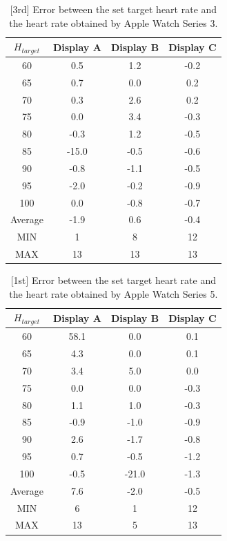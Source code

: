 \documentclass[sigchi,authordraft]{acmart}
\begin{document}
\begin{table}[!t]
  \centering
  \caption{[3rd] Error between the set target heart rate and the heart rate obtained by Apple Watch Series 3.}
  \begin{tabular}{c|c|c|c} \hline\hline
    $H_{target}$ & Display A & Display B & Display C \\ \hline
    60 & 0.5 & 1.2 & -0.2 \\
    65 & 0.7 & 0.0 & 0.2 \\
    70 & 0.3 & 2.6 & 0.2 \\
    75 & 0.0 & 3.4 & -0.3 \\
    80 & -0.3 & 1.2 & -0.5 \\
    85 & -15.0 & -0.5 & -0.6 \\
    90 & -0.8 & -1.1 & -0.5 \\
    95 & -2.0 & -0.2 & -0.9 \\
    100 & 0.0 & -0.8 & -0.7 \\ \hline
    Average & -1.9 & 0.6 & -0.4 \\ \hline \hline
    MIN & 1 & 8 & 12 \\ \hline
    MAX & 13 & 13 & 13 \\ \hline
  \end{tabular}
  \label{tab:series3_result_3rd}
\end{table}

\begin{table}[!t]
  \centering
  \caption{[1st] Error between the set target heart rate and the heart rate obtained by Apple Watch Series 5.}
  \begin{tabular}{c|c|c|c} \hline\hline
    $H_{target}$ & Display A & Display B & Display C \\ \hline
    60 & 58.1 & 0.0 & 0.1 \\
    65 & 4.3 & 0.0 & 0.1 \\
    70 & 3.4 & 5.0 & 0.0 \\
    75 & 0.0 & 0.0 & -0.3 \\
    80 & 1.1 & 1.0 & -0.3 \\
    85 & -0.9 & -1.0 & -0.9 \\
    90 & 2.6 & -1.7 & -0.8 \\
    95 & 0.7 & -0.5 & -1.2 \\
    100 & -0.5 & -21.0 & -1.3 \\ \hline
    Average & 7.6 & -2.0 & -0.5 \\ \hline \hline
    MIN & 6 & 1 & 12 \\ \hline
    MAX & 13 & 5 & 13 \\ \hline
  \end{tabular}
  \label{tab:series5_result_1st}
\end{table}
\end{document}
